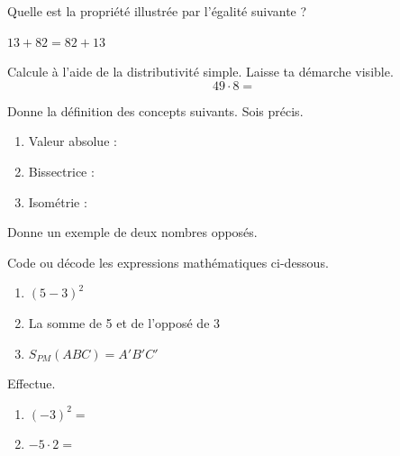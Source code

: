 \documentclass[parskip=half-,DIV=12,twoside=semi, 12pt]{scrartcl}
\newcounter{l}
\begin{document}
\begin{connaitre}[points=1]
    Quelle est la propriété illustrée par l'égalité suivante ?

    \hfil \(13+82 = 82 + 13\) \hfil {}
\end{connaitre}
\begin{connaitre}[points=1]
    Calcule à l'aide de la distributivité simple. Laisse ta démarche visible.
    \[49 \cdot 8=\]
    \vspace{3cm}
\end{connaitre}
\begin{connaitre}[points=3]
    Donne la définition des concepts suivants. Sois précis.
    \begin{enumerate}[itemsep=2cm, after=\vspace*{2cm}]
        \item Valeur absolue :
        \item Bissectrice :
        \item Isométrie :
    \end{enumerate}
\end{connaitre}
\begin{connaitre}[points=1]
    Donne un exemple de deux nombres opposés.
    \vspace*{2cm}
\end{connaitre}
\begin{connaitre}[points=3]
    Code ou décode les expressions mathématiques ci-dessous.
    \begin{enumerate}[itemsep=1.5cm, after=\vspace*{1cm}]
        \item \((5-3)^2\)
        \item La somme de 5 et de l'opposé de 3
        \item \(S_{PM}(ABC) = A'B'C'\) \vspace*{2cm}
    \end{enumerate}
\end{connaitre}
\begin{appliquer}[points=2]
    Effectue.
    \begin{enumerate}[cols=2]
        \item \((-3)^2 =\)
        \item \(-5 \cdot 2 = \)
    \end{enumerate}
\end{appliquer}
\end{document}
